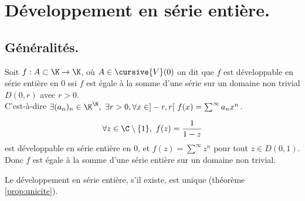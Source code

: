 \documentclass[11pt]{article}
\begin{document}
\vspace*{-0.3cm}

\section{Développement en série entière.}

\subsection{Généralités.}

\begin{defi}{}{}
    Soit $f:A\subset \K \to \K$, où $A\in\cursive{V}(0)$ on dit que $f$ est développable en série entière en $0$ ssi $f$ est égale à la somme d'une série sur un domaine non trivial $D(0,r)$ avec $r>0$.\\
    C'est-à-dire $\exists (a_n)_n \in \K^\N, ~ \exists r > 0, \forall x \in ]-r,r[ ~ f(x)=\sum^\infty a_nx^n$.
\end{defi}

\vspace*{-0.3cm}

\begin{ex}{}{}
    \begin{equation*}
        \forall z \in \C\setminus\{1\}, ~ f(z) = \frac{1}{1-z}
    \end{equation*}
    est développable en série entière en 0, et $f(z)=\sum^\infty z^n$ pour tout $z\in D(0,1)$.\\
    Donc $f$ est égale à la somme d'une série entière sur un domaine non trivial.
\end{ex}

\vspace*{-0.3cm}

\begin{prop}{}{}
    Le développement en série entière, s'il existe, est unique (théorème \ref{prop:unicite}).
\end{prop}

\vspace*{-0.3cm}
\end{document}
